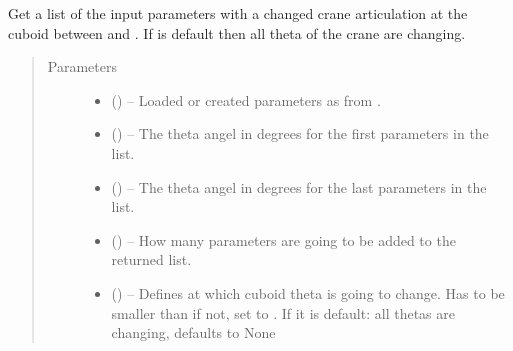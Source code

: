\documentclass[letterpaper,10pt,english]{sphinxmanual}
\begin{document}
\begin{fulllineitems}
\begin{fulllineitems}
\label{\detokenize{index:dataset.dataset_cuboids.change_articulation_theta}}
Get a list of the input parameters with a changed crane articulation at the cuboid  between  and .
If  is default then all theta of the crane are changing.
\begin{quote}\begin{description}
\item[{Parameters}] \leavevmode\begin{itemize}
\item {} 
 () -- Loaded or created parameters as from {\hyperref[\detokenize{index:dataset.dataset_cuboids.create_random_parameters}]{}}.

\item {} 
 () -- The theta angel in degrees for the first parameters in the list.

\item {} 
 () -- The theta angel in degrees for the last parameters in the list.

\item {} 
 () -- How many parameters are going to be added to the returned list.

\item {} 
 (\sphinxstyleliteralemphasis{\sphinxupquote{, }}) -- Defines at which cuboid theta is going to change. Has to be smaller than  if not, set to . If it is default:  all thetas are changing, defaults to None


\end{itemize}
\end{description}
\end{quote}
\end{fulllineitems}
\end{fulllineitems}
\end{document}
